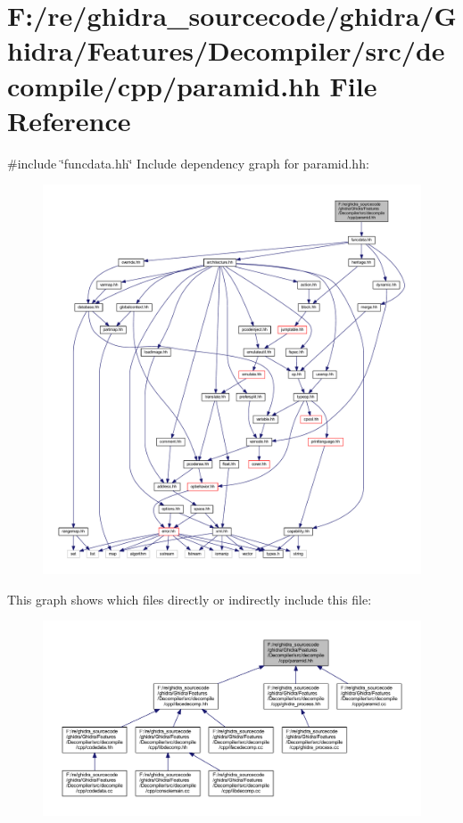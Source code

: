 \hypertarget{paramid_8hh}{}\section{F\+:/re/ghidra\+\_\+sourcecode/ghidra/\+Ghidra/\+Features/\+Decompiler/src/decompile/cpp/paramid.hh File Reference}
\label{paramid_8hh}
{\ttfamily \#include \char`\"{}funcdata.\+hh\char`\"{}}\newline
Include dependency graph for paramid.\+hh\+:
\nopagebreak
\begin{figure}[H]
\begin{center}
\leavevmode
\includegraphics[width=350pt]{paramid_8hh__incl}
\end{center}
\end{figure}
This graph shows which files directly or indirectly include this file\+:
\nopagebreak
\begin{figure}[H]
\begin{center}
\leavevmode
\includegraphics[width=350pt]{paramid_8hh__dep__incl}
\end{center}
\end{figure}
